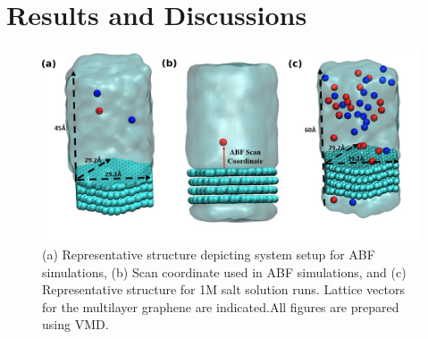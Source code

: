 

\section{Results and Discussions}
\begin{figure}
    \centering
    \includegraphics[width=\textwidth]{Chapter3/Figures/FigureS1.png}
    \caption[Representative structures depicting system setup for various systems investigated in this study]{(a) Representative structure depicting system setup for ABF simulations, (b) Scan coordinate used in ABF simulations, and (c) Representative structure for 1M salt solution runs. Lattice vectors for the multilayer graphene are indicated.All figures are prepared using VMD\supercite{humphrey_vmd_1996}.}
\end{figure}

